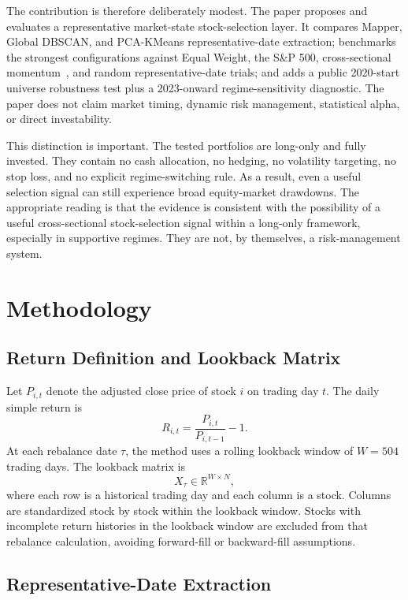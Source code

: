 \documentclass[runningheads]{llncs}
\begin{document}
The contribution is therefore deliberately modest. The paper proposes and evaluates a representative market-state stock-selection layer. It compares Mapper, Global DBSCAN, and PCA-KMeans representative-date extraction; benchmarks the strongest configurations against Equal Weight, the S\&P 500, cross-sectional momentum~\cite{jegadeesh1993}, and random representative-date trials; and adds a public 2020-start universe robustness test plus a 2023-onward regime-sensitivity diagnostic. The paper does not claim market timing, dynamic risk management, statistical alpha, or direct investability.

This distinction is important. The tested portfolios are long-only and fully invested. They contain no cash allocation, no hedging, no volatility targeting, no stop loss, and no explicit regime-switching rule. As a result, even a useful selection signal can still experience broad equity-market drawdowns. The appropriate reading is that the evidence is consistent with the possibility of a useful cross-sectional stock-selection signal within a long-only framework, especially in supportive regimes. They are not, by themselves, a risk-management system.

\section{Methodology}

\subsection{Return Definition and Lookback Matrix}

Let $P_{i,t}$ denote the adjusted close price of stock $i$ on trading day $t$. The daily simple return is
\begin{equation}
R_{i,t} = \frac{P_{i,t}}{P_{i,t-1}} - 1.
\end{equation}
At each rebalance date $\tau$, the method uses a rolling lookback window of $W=504$ trading days. The lookback matrix is
\begin{equation}
X_{\tau} \in \mathbb{R}^{W \times N},
\end{equation}
where each row is a historical trading day and each column is a stock. Columns are standardized stock by stock within the lookback window. Stocks with incomplete return histories in the lookback window are excluded from that rebalance calculation, avoiding forward-fill or backward-fill assumptions.

\subsection{Representative-Date Extraction}
\end{document}
